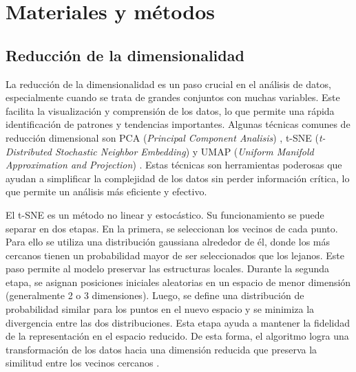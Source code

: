 \chapter{Materiales y métodos}
\label{cap1}
\section{Reducción de la dimensionalidad}
\label{c11}
\onehalfspacing


La reducción de la dimensionalidad es un paso crucial en el análisis de datos, especialmente cuando se trata de grandes conjuntos con muchas variables. Este facilita la visualización y comprensión de los datos, lo que permite una rápida identificación de patrones y tendencias importantes. Algunas técnicas comunes de reducción dimensional son PCA (\textit{Principal Component Analisis}) \cite{Pearson1901, Hotelling1933, Lever2017}, t-SNE (\textit{t-Distributed Stochastic Neighbor Embedding}) \cite{Maaten2008} y UMAP (\textit{Uniform Manifold Approximation and Projection}) \cite{McInnes2018, Becht2019}. Estas técnicas son herramientas poderosas que ayudan a simplificar la complejidad de los datos sin perder información crítica, lo que permite un análisis más eficiente y efectivo.

El t-SNE es un método no linear y estocástico. Su funcionamiento se puede separar en dos etapas. En la primera, se seleccionan los vecinos de cada punto. Para ello se utiliza una distribución gaussiana alrededor de él, donde los más cercanos tienen un probabilidad mayor de ser seleccionados que los lejanos. Este paso permite al modelo preservar las estructuras locales. Durante la segunda etapa, se asignan posiciones iniciales aleatorias en un espacio de menor dimensión (generalmente 2 o 3 dimensiones). Luego, se define una distribución de probabilidad similar para los puntos en el nuevo espacio y se minimiza la divergencia entre las dos distribuciones. Esta etapa ayuda a mantener la fidelidad de la representación en el espacio reducido. De esta forma, el algoritmo logra una transformación de los datos hacia una dimensión reducida que preserva la similitud entre los vecinos cercanos \cite{Maaten2008, Jung_2024, Wattenberg2016, Linderman2019}.

